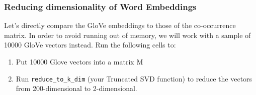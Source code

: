 \documentclass[11pt]{article}
\providecommand{\tightlist}{%
      \setlength{\itemsep}{0pt}\setlength{\parskip}{0pt}}
\begin{document}
    \hypertarget{reducing-dimensionality-of-word-embeddings}{%
\subsubsection{Reducing dimensionality of Word
Embeddings}\label{reducing-dimensionality-of-word-embeddings}}

Let's directly compare the GloVe embeddings to those of the
co-occurrence matrix. In order to avoid running out of memory, we will
work with a sample of 10000 GloVe vectors instead. Run the following
cells to:

\begin{enumerate}
\def\labelenumi{\arabic{enumi}.}
\tightlist
\item
  Put 10000 Glove vectors into a matrix M
\item
  Run \texttt{reduce\_to\_k\_dim} (your Truncated SVD function) to
  reduce the vectors from 200-dimensional to 2-dimensional.
\end{enumerate}
\end{document}
